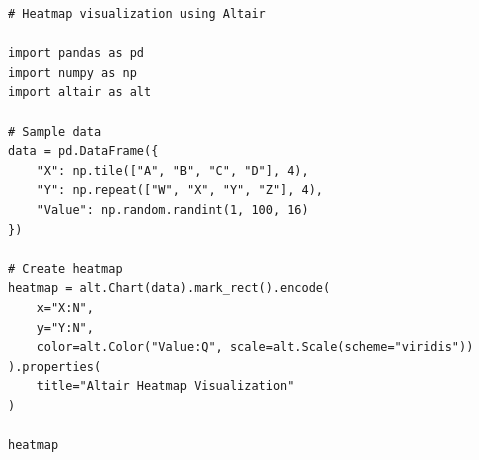 \begin{verbatim}
# Heatmap visualization using Altair

import pandas as pd
import numpy as np
import altair as alt

# Sample data
data = pd.DataFrame({
    "X": np.tile(["A", "B", "C", "D"], 4),
    "Y": np.repeat(["W", "X", "Y", "Z"], 4),
    "Value": np.random.randint(1, 100, 16)
})

# Create heatmap
heatmap = alt.Chart(data).mark_rect().encode(
    x="X:N",
    y="Y:N",
    color=alt.Color("Value:Q", scale=alt.Scale(scheme="viridis"))
).properties(
    title="Altair Heatmap Visualization"
)

heatmap
\end{verbatim}